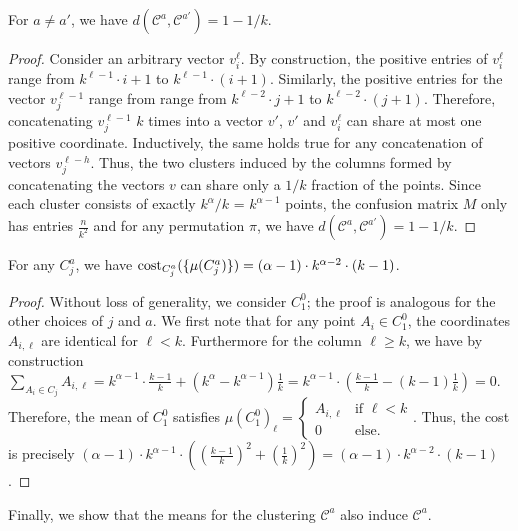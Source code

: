 \begin{fact}
For $a\neq a'$, we have $d(\mathcal{C}^{a},\mathcal{C}^{a'}) = 1-1/k$.
\end{fact}
\begin{proof}
Consider an arbitrary vector $v_i^{\ell}$. By construction, the positive entries of $v_i^{\ell}$ range from $k^{\ell-1}\cdot i+1$ to $k^{\ell-1}\cdot (i+1)$. Similarly, the positive entries for the vector $v_j^{\ell-1}$ range from range from $k^{\ell-2}\cdot j+1$ to $k^{\ell-2}\cdot (j+1)$. Therefore, concatenating $v_j^{\ell-1}$ $k$ times into a vector $v'$, $v'$ and $v_i^{\ell}$ can share at most one positive coordinate. Inductively, the same holds true for any concatenation of vectors $v_j^{\ell-h}$.
Thus, the two clusters induced by the columns formed by concatenating the vectors $v$ can share only a $1/k$ fraction of the points. Since each cluster consists of exactly $k^{\alpha}/k$ = $k^{\alpha-1}$ points, the confusion matrix $M$ only has entries $\frac{n}{k^2}$ and for any permutation $\pi$, we have $d(\mathcal{C}^{a},\mathcal{C}^{a'}) = 1-1/k$.
\end{proof}

\begin{fact}
\label{fact:cost}
For any $C_j^a$, we have $\text{cost}_{C_j^a}(\{\mu(C_j^a)\}) = (\alpha-1)\cdot k^{\alpha-2}\cdot (k-1)$.
\end{fact}
\begin{proof}
Without loss of generality, we consider $C_1^0$; the proof is analogous for the other choices of $j$ and $a$. We first note that for any point $A_i \in C_1^0$, the coordinates $A_{i,\ell}$ are identical for $\ell <k$. Furthermore for the column $\ell\geq k$, we have by construction $\sum_{A_i\in C_j} A_{i,\ell} = k^{\alpha-1}\cdot \frac{k-1}{k} + (k^{\alpha}-k^{\alpha-1})\frac{1}{k}=k^{\alpha-1}\cdot (\frac{k-1}{k} - (k-1)\frac{1}{k}) = 0.$ Therefore, the mean of $C_1^0$ satisfies $\mu(C_1^0)_{\ell} = \begin{cases}A_{i,\ell} &\text{if }\ell<k \\
0 &\text{else.}\end{cases}$. 
Thus, the cost is precisely $(\alpha-1)\cdot k^{\alpha-1}\cdot \left(\left(\frac{k-1}{k}\right)^2 + \left(\frac{1}{k}\right)^2 \right)=(\alpha-1)\cdot k^{\alpha-2}\cdot (k-1)$.
\end{proof}

Finally, we show that the means for the clustering $\mathcal{C}^{a}$ also induce $\mathcal{C}^{a}$.

